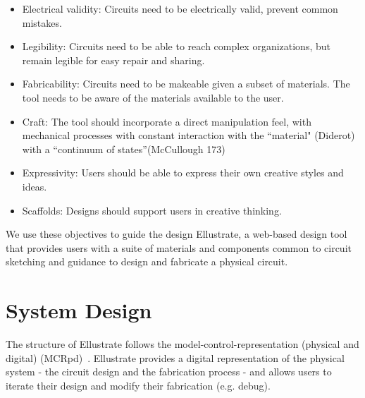\documentclass{sigchi}
\begin{document}
    \begin{itemize}
        \item Electrical validity: Circuits need to be electrically valid, prevent common mistakes.
        \item Legibility: Circuits need to be able to reach complex organizations, but remain legible for easy repair and sharing. 
        \item Fabricability: Circuits need to be makeable given a subset of materials. The tool needs to be aware of the materials available to the user. 
        \item Craft: The tool should incorporate a direct manipulation feel, with mechanical processes with constant interaction with the ``material" (Diderot) with a ``continuum of states''(McCullough 173)
        \item Expressivity: Users should be able to express their own creative styles and ideas. 
        \item Scaffolds: Designs should support users in creative thinking. 
    \end{itemize}
We use these objectives to guide the design Ellustrate, a web-based design tool that provides users with a suite of materials and components common to circuit sketching and guidance to design and fabricate a physical circuit.

\section{System Design}
The structure of Ellustrate follows the model-control-representation (physical and digital) (MCRpd)~\cite{ullmer2000emerging}. Ellustrate provides a digital representation of the physical system - the circuit design and the fabrication process - and allows users to iterate their design and modify their fabrication (e.g. debug). 
\end{document}
